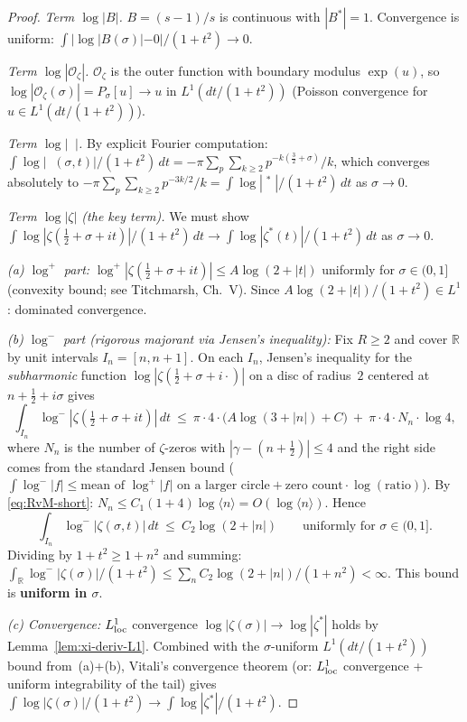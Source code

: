 \documentclass[11pt]{amsart}
\theoremstyle{definition}
\theoremstyle{remark}
\DeclareMathOperator{\dettwo}{det_2}
\newcommand{\angles}[1]{\langle #1\rangle}
\begin{document}
{\begin{proof}
\emph{Term \(\log|B|\).} \(B=(s\!-\!1)/s\) is continuous with \(|B^*|=1\).
Convergence is uniform: \(\int|\log|B(\sigma)|-0|/(1+t^2)\to 0\). \checkmark

\emph{Term \(\log|\mathcal O_\zeta|\).}
\(\mathcal O_\zeta\) is the outer function with boundary modulus \(\exp(u)\),
so \(\log|\mathcal O_\zeta(\sigma)|=P_\sigma[u]\to u\)
in \(L^1(dt/(1+t^2))\) (Poisson convergence for \(u\in L^1(dt/(1+t^2))\)). \checkmark

\emph{Term \(\log|\dettwo|\).}
By explicit Fourier computation:
\(\int\log|\dettwo(\sigma,t)|/(1+t^2)\,dt
=-\pi\sum_p\sum_{k\ge 2}p^{-k(\tfrac32+\sigma)}/k\),
which converges absolutely to
\(-\pi\sum_p\sum_{k\ge 2}p^{-3k/2}/k=\int\log|\dettwo^*|/(1+t^2)\,dt\)
as \(\sigma\to 0\). \checkmark

\emph{Term \(\log|\zeta|\) (the key term).}
We must show \(\int\log|\zeta(\tfrac12+\sigma+it)|/(1+t^2)\,dt
\to\int\log|\zeta^*(t)|/(1+t^2)\,dt\) as \(\sigma\to 0\).

\emph{(a) \(\log^+\) part:}
\(\log^+|\zeta(\tfrac12+\sigma+it)|\le A\log(2+|t|)\) uniformly for \(\sigma\in(0,1]\)
(convexity bound; see Titchmarsh, Ch.~V).
Since \(A\log(2+|t|)/(1+t^2)\in L^1\): dominated convergence. \checkmark

\emph{(b) \(\log^-\) part (rigorous majorant via Jensen's inequality):}
Fix \(R\ge 2\) and cover \(\mathbb R\) by unit intervals \(I_n=[n,n+1]\).
On each \(I_n\), Jensen's inequality for the \emph{subharmonic} function
\(\log|\zeta(\tfrac12+\sigma+i\cdot)|\) on a disc of radius~\(2\) centered at \(n+\tfrac12+i\sigma\)
gives
\[
  \int_{I_n}\log^-|\zeta(\tfrac12+\sigma+it)|\,dt
  \ \le\ \pi\cdot 4\cdot\bigl(A\log(3+|n|)+C\bigr)\ +\ \pi\cdot 4\cdot N_n\cdot\log 4,
\]
where \(N_n\) is the number of \(\zeta\)-zeros with \(|\gamma-(n+\tfrac12)|\le 4\)
and the right side comes from the standard Jensen bound
(\(\int\log^-|f|\le\text{mean of }\log^+|f|\text{ on a larger circle}
+\text{zero count}\cdot\log(\text{ratio})\)).
By \eqref{eq:RvM-short}: \(N_n\le C_1(1+4)\log\angles{n}=O(\log\angles{n})\).
Hence
\[
  \int_{I_n}\log^-|\zeta(\sigma,t)|\,dt\ \le\ C_2\log(2+|n|)
  \qquad\text{uniformly for }\sigma\in(0,1].
\]
Dividing by \(1+t^2\ge 1+n^2\) and summing:
\(\int_{\mathbb R}\log^-|\zeta(\sigma)|/(1+t^2)\le\sum_n C_2\log(2+|n|)/(1+n^2)<\infty\).
This bound is \textbf{uniform in \(\sigma\)}. \checkmark

\emph{(c) Convergence:}
\(L^1_{\rm loc}\) convergence \(\log|\zeta(\sigma)|\to\log|\zeta^*|\) holds by
Lemma~\ref{lem:xi-deriv-L1}.
Combined with the \(\sigma\)-uniform \(L^1(dt/(1+t^2))\) bound from~(a)+(b),
Vitali's convergence theorem (or: \(L^1_{\rm loc}\) convergence + uniform integrability
of the tail) gives
\(\int\log|\zeta(\sigma)|/(1+t^2)\to\int\log|\zeta^*|/(1+t^2)\). \checkmark


\end{proof}}
\end{document}
